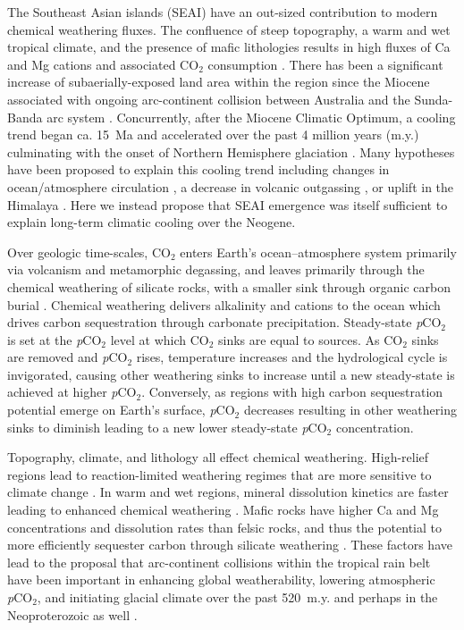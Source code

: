 \documentclass[11pt,letterpaper]{article}
\newcommand{\pCOtwo}{\textit{p}CO$_{2}$\xspace}
\newcommand{\COtwo}{CO$_{2}$\xspace}
\begin{document}
The Southeast Asian islands (SEAI) have an out-sized contribution to modern chemical weathering fluxes. The confluence of steep topography, a warm and wet tropical climate, and the presence of mafic lithologies results in high fluxes of Ca and Mg cations and associated \COtwo consumption \cite{Gaillardet1999a}. There has been a significant increase of subaerially-exposed land area within the region since the Miocene associated with ongoing arc-continent collision between Australia and the Sunda-Banda arc system \cite{Molnar2015a, Macdonald2019a}. Concurrently, after the Miocene Climatic Optimum, a cooling trend began ca. 15~Ma and accelerated over the past 4 million years (m.y.) culminating with the onset of Northern Hemisphere glaciation \cite{Zachos2001a}. Many hypotheses have been proposed to explain this cooling trend including changes in ocean/atmosphere circulation \cite{Haug1998a, Shevenell2004a, Molnar2015a}, a decrease in volcanic outgassing \cite{Berner1983a}, or uplift in the Himalaya \cite{Raymo1992a}. Here we instead propose that SEAI emergence was itself sufficient to explain long-term climatic cooling over the Neogene.

Over geologic time-scales, \COtwo enters Earth's ocean--atmosphere system primarily via volcanism and metamorphic degassing, and leaves primarily through the chemical weathering of silicate rocks, with a smaller sink through organic carbon burial \cite{Kump1997a}. Chemical weathering delivers alkalinity and cations to the ocean which drives carbon sequestration through carbonate precipitation. Steady-state \pCOtwo is set at the \pCOtwo level at which \COtwo sinks are equal to sources. As \COtwo sinks are removed and \pCOtwo rises, temperature increases and the hydrological cycle is invigorated, causing other weathering sinks to increase until a new steady-state is achieved at higher \pCOtwo \cite{Kump1997a}. Conversely, as regions with high carbon sequestration potential emerge on Earth's surface, \pCOtwo decreases resulting in other weathering sinks to diminish leading to a new lower steady-state \pCOtwo concentration.

Topography, climate, and lithology all effect chemical weathering. High-relief regions lead to reaction-limited weathering regimes that are more sensitive to climate change \cite{Gabet2009a, West2012a}. In warm and wet regions, mineral dissolution kinetics are faster leading to enhanced chemical weathering \cite{West2012a}. Mafic rocks have higher Ca and Mg concentrations and dissolution rates than felsic rocks, and thus the potential to more efficiently sequester carbon through silicate weathering \cite{Dessert2003a}. These factors have lead to the proposal that arc-continent collisions within the tropical rain belt have been important in enhancing global weatherability, lowering atmospheric \pCOtwo, and initiating glacial climate over the past 520~m.y. \cite{Jagoutz2016a, Swanson-Hysell2017a, Macdonald2019a} and perhaps in the Neoproterozoic as well \cite{Park2019b}.
\end{document}
